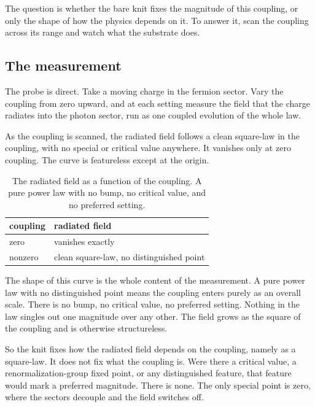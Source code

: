 The question is whether the bare knit fixes the magnitude of this coupling, or only the shape of how the physics depends on it. To answer it, scan the coupling across its range and watch what the substrate does.

\subsection{The measurement}

The probe is direct. Take a moving charge in the fermion sector. Vary the coupling from zero upward, and at each setting measure the field that the charge radiates into the photon sector, run as one coupled evolution of the whole law.

\begin{result}
As the coupling is scanned, the radiated field follows a clean square-law in the coupling, with no special or critical value anywhere. It vanishes only at zero coupling. The curve is featureless except at the origin.
\end{result}

\begin{table}[ht]
\centering
\begin{tabular}{@{}ll@{}}
\toprule
coupling & radiated field \\
\midrule
zero & vanishes exactly \\
nonzero & clean square-law, no distinguished point \\
\bottomrule
\end{tabular}
\caption{The radiated field as a function of the coupling. A pure power law with no bump, no critical value, and no preferred setting.}
\label{tab:coupling-scan}
\end{table}

The shape of this curve is the whole content of the measurement. A pure power law with no distinguished point means the coupling enters purely as an overall scale. There is no bump, no critical value, no preferred setting. Nothing in the law singles out one magnitude over any other. The field grows as the square of the coupling and is otherwise structureless.

So the knit fixes how the radiated field depends on the coupling, namely as a square-law. It does not fix what the coupling is. Were there a critical value, a renormalization-group fixed point, or any distinguished feature, that feature would mark a preferred magnitude. There is none. The only special point is zero, where the sectors decouple and the field switches off.

